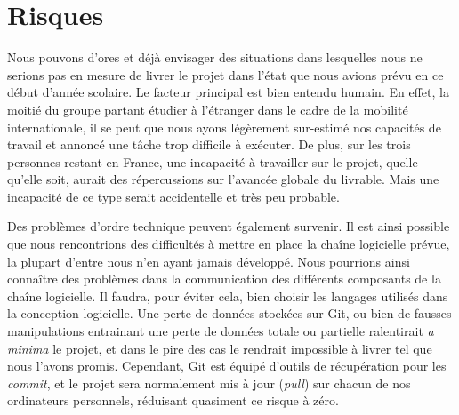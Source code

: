 \section{Risques}
    Nous pouvons d'ores et déjà envisager des situations dans lesquelles nous ne serions pas en mesure de livrer le projet dans l'état que nous avions prévu en ce début d'année scolaire.
    Le facteur principal est bien entendu humain. En effet, la moitié du groupe partant étudier à l'étranger dans le cadre de la mobilité internationale, il se peut que nous ayons légèrement sur-estimé nos capacités de travail et annoncé une tâche trop difficile à exécuter. De plus, sur les trois personnes restant en France, une incapacité à travailler sur le projet, quelle qu'elle soit, aurait des répercussions sur l'avancée globale du livrable. Mais une incapacité de ce type serait accidentelle et très peu probable.
    
    Des problèmes d'ordre technique peuvent également survenir. Il est ainsi possible que nous rencontrions des difficultés à mettre en place la chaîne logicielle prévue, la plupart d'entre nous n'en ayant jamais développé. Nous pourrions ainsi connaître des problèmes dans la communication des différents composants de la chaîne logicielle. Il faudra, pour éviter cela, bien choisir les langages utilisés dans la conception logicielle.
    Une perte de données stockées sur Git, ou bien de fausses manipulations entrainant une perte de données totale ou partielle ralentirait \textit{a minima} le projet, et dans le pire des cas le rendrait impossible à livrer tel que nous l'avons promis. Cependant, Git est équipé d'outils de récupération pour les \textit{commit}, et le projet sera normalement mis à jour (\textit{pull}) sur chacun de nos ordinateurs personnels, réduisant quasiment ce risque à zéro.
